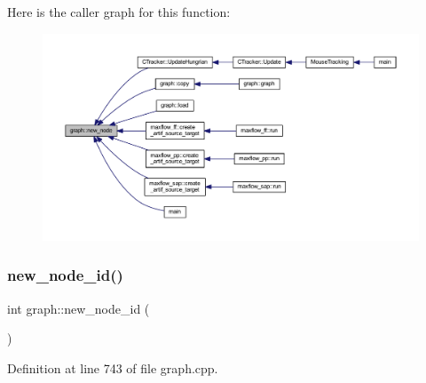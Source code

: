 Here is the caller graph for this function\+:
\nopagebreak
\begin{figure}[H]
\begin{center}
\leavevmode
\includegraphics[width=350pt]{classgraph_ab9505335c20558319b6cce25aed23524_icgraph}
\end{center}
\end{figure}
\mbox{\label{classgraph_a4c9af44fa03250994dd1dd972bd7cdfc}} 
\subsubsection{\texorpdfstring{new\+\_\+node\+\_\+id()}{new\_node\_id()}}
{\footnotesize\ttfamily int graph\+::new\+\_\+node\+\_\+id (\begin{DoxyParamCaption}{ }\end{DoxyParamCaption})\hspace{0.3cm}{\ttfamily [private]}}



Definition at line 743 of file graph.\+cpp.


